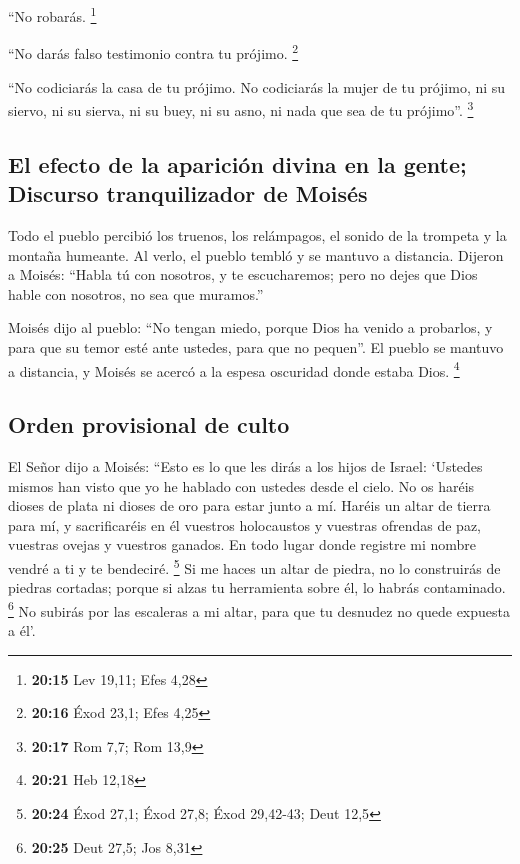  ``No robarás. \footnote{\textbf{20:15} Lev 19,11; Efes
  4,28}

 ``No darás falso testimonio contra tu prójimo.
\footnote{\textbf{20:16} Éxod 23,1; Efes 4,25}

 ``No codiciarás la casa de tu prójimo. No codiciarás la
mujer de tu prójimo, ni su siervo, ni su sierva, ni su buey, ni su asno,
ni nada que sea de tu prójimo''. \footnote{\textbf{20:17} Rom 7,7; Rom
  13,9}

\hypertarget{el-efecto-de-la-apariciuxf3n-divina-en-la-gente-discurso-tranquilizador-de-moisuxe9s}{%
\subsection{El efecto de la aparición divina en la gente; Discurso
tranquilizador de
Moisés}\label{el-efecto-de-la-apariciuxf3n-divina-en-la-gente-discurso-tranquilizador-de-moisuxe9s}}

 Todo el pueblo percibió los truenos, los relámpagos, el
sonido de la trompeta y la montaña humeante. Al verlo, el pueblo tembló
y se mantuvo a distancia.  Dijeron a Moisés: ``Habla tú
con nosotros, y te escucharemos; pero no dejes que Dios hable con
nosotros, no sea que muramos.''

 Moisés dijo al pueblo: ``No tengan miedo, porque Dios ha
venido a probarlos, y para que su temor esté ante ustedes, para que no
pequen''.  El pueblo se mantuvo a distancia, y Moisés se
acercó a la espesa oscuridad donde estaba Dios. \footnote{\textbf{20:21}
  Heb 12,18}

\hypertarget{orden-provisional-de-culto}{%
\subsection{Orden provisional de
culto}\label{orden-provisional-de-culto}}

 El Señor dijo a Moisés: ``Esto es lo que les dirás a los
hijos de Israel: `Ustedes mismos han visto que yo he hablado con ustedes
desde el cielo.  No os haréis dioses de plata ni dioses
de oro para estar junto a mí.  Haréis un altar de tierra
para mí, y sacrificaréis en él vuestros holocaustos y vuestras ofrendas
de paz, vuestras ovejas y vuestros ganados. En todo lugar donde registre
mi nombre vendré a ti y te bendeciré. \footnote{\textbf{20:24} Éxod
  27,1; Éxod 27,8; Éxod 29,42-43; Deut 12,5}  Si me haces
un altar de piedra, no lo construirás de piedras cortadas; porque si
alzas tu herramienta sobre él, lo habrás contaminado. \footnote{\textbf{20:25}
  Deut 27,5; Jos 8,31}  No subirás por las escaleras a mi
altar, para que tu desnudez no quede expuesta a él'.

